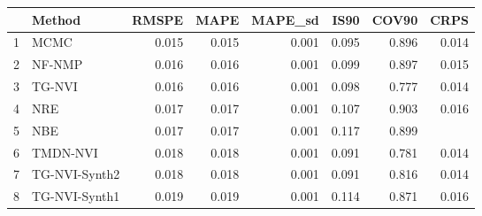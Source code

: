 \documentclass[12pt]{article}
\begin{document}
\thispagestyle{empty}
\begin{table}[ht]
\centering
\begin{tabular}{rlrrrrrr}
  \hline
 & Method & RMSPE & MAPE & MAPE\_sd & IS90 & COV90 & CRPS \\ 
  \hline
1 & MCMC & 0.015 & 0.015 & 0.001 & 0.095 & 0.896 & 0.014 \\ 
  2 & NF-NMP & 0.016 & 0.016 & 0.001 & 0.099 & 0.897 & 0.015 \\ 
  3 & TG-NVI & 0.016 & 0.016 & 0.001 & 0.098 & 0.777 & 0.014 \\ 
  4 & NRE & 0.017 & 0.017 & 0.001 & 0.107 & 0.903 & 0.016 \\ 
  5 & NBE & 0.017 & 0.017 & 0.001 & 0.117 & 0.899 &  \\ 
  6 & TMDN-NVI & 0.018 & 0.018 & 0.001 & 0.091 & 0.781 & 0.014 \\ 
  7 & TG-NVI-Synth2 & 0.018 & 0.018 & 0.001 & 0.091 & 0.816 & 0.014 \\ 
  8 & TG-NVI-Synth1 & 0.019 & 0.019 & 0.001 & 0.114 & 0.871 & 0.016 \\ 
   \hline
\end{tabular}
\end{table}
\end{document}
